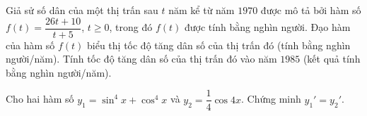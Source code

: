 \begin{bt}%
	Giả sử số dân của một thị trấn sau $t$ năm kể từ năm $1970$ được mô tả bởi hàm số $f(t)=\dfrac{26 t+10}{t+5}$, $t \geq 0$, trong đó $f(t)$ được tính bằng nghìn người. Đạo hàm của hàm số $f(t)$ biểu thị tốc độ tăng dân số của thị trấn đó (tính bằng nghìn người/năm). Tính tốc độ tăng dân số của thị trấn đó vào năm $1985$ (kết quả tính bằng nghìn người/năm).
\end{bt}

\begin{bt}%
	Cho hai hàm số $y_1=\sin^4x+\cos ^4x$ và $y_2=\dfrac{1}{4}\cos 4x$. Chứng minh $y_1'=y_2'$.
\end{bt}

